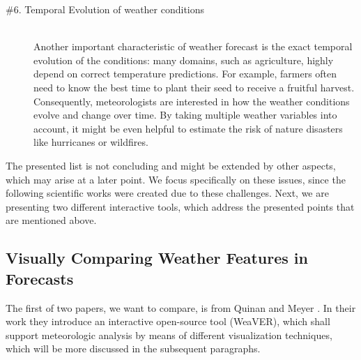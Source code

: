 \documentclass[citeauthoryear]{llncs}
\begin{document}
\begin{description}
\item[\#6. Temporal Evolution of weather conditions] \ \\ 
Another important characteristic of weather forecast is the exact temporal evolution of the conditions: many domains, such as agriculture, highly depend on correct temperature predictions. For example, farmers often need to know the best time to plant their seed to receive a fruitful harvest. Consequently, meteorologists are interested in how the weather conditions evolve and change over time. By taking multiple weather variables into account, it might be even helpful to estimate the risk of nature disasters like hurricanes or wildfires.
\end{description}

\noindent The presented list is not concluding and might be extended by other aspects, which may arise at a later point. We focus specifically on these issues, since the following scientific works were created due to these challenges. Next, we are presenting two different interactive tools, which address the presented points that are mentioned above.

\newpage
\subsection{Visually Comparing Weather Features in Forecasts}
The first of two papers, we want to compare, is from Quinan and Meyer \cite{quinan2016visually}. In their work they introduce an interactive open-source tool (WeaVER), which shall support meteorologic analysis by means of different visualization techniques, which will be more discussed in the subsequent paragraphs. \\
\end{document}
